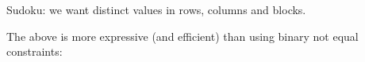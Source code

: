 \documentclass{cons-beamer}
\begin{document}
\begin{flashcardcpmpy}
\begin{frame}
  \begin{example}
    Sudoku: we want distinct values in rows, columns and blocks.

    
    \vfill

    The above is more expressive (and efficient) than using binary not equal constraints:
    \vfill

    
  \end{example}
\end{frame}
\end{flashcardcpmpy}
\end{document}
